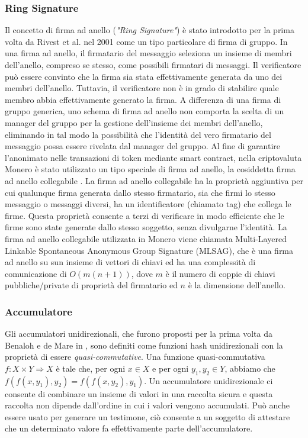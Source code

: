 \subsubsection{Ring Signature}
Il concetto di firma ad anello (\emph{"Ring Signature"}) è stato introdotto per la prima volta da Rivest et al. \cite{c27} nel 2001 come un tipo particolare di firma di gruppo. In una firma ad anello, il firmatario del messaggio seleziona un insieme di membri dell'anello, compreso se stesso, come possibili firmatari di messaggi. Il verificatore può essere convinto che la firma sia stata effettivamente generata da uno dei membri dell'anello.
Tuttavia, il verificatore non è in grado di stabilire quale membro abbia effettivamente generato la firma. A differenza di una firma di gruppo generica, uno schema di firma ad anello non comporta la scelta di un manager del gruppo per la gestione dell'insieme dei membri dell'anello, eliminando in tal modo la possibilità che l'identità del vero firmatario del messaggio possa essere rivelata dal manager del gruppo. Al fine di garantire l'anonimato nelle transazioni di token mediante smart contract, nella criptovaluta Monero è stato utilizzato un tipo speciale di firma ad anello, la cosiddetta firma ad anello collegabile \cite{c20}. La firma ad anello collegabile ha la proprietà aggiuntiva per cui qualunque firma generata dallo stesso firmatario, sia che firmi lo stesso messaggio o messaggi diversi, ha un identificatore (chiamato tag) che collega le firme. Questa proprietà consente a terzi di verificare in modo efficiente che le firme sono state generate dallo stesso soggetto, senza divulgarne l'identità. La firma ad anello collegabile utilizzata in Monero viene chiamata  Multi-Layered Linkable Spontaneous Anonymous Group Signature (MLSAG)\cite{c22}, che è una firma ad anello su sun insieme di vettori di chiavi ed ha una complessità di comunicazione di $O(m(n + 1))$, dove $m$ è il numero di coppie di chiavi pubbliche/private di proprietà del firmatario ed $n$ è la dimensione dell'anello.

\subsubsection{Accumulatore}
Gli accumulatori unidirezionali, che furono proposti per la prima volta da Benaloh e de Mare in \cite{c2}, sono definiti come funzioni hash unidirezionali con la proprietà di essere \emph{quasi-commutative}. Una funzione quasi-commutativa $f: X \times Y \Rightarrow X$ è tale che, per ogni $x \in X$ e per ogni $y_1, y_2 \in Y$, abbiamo che $f(f(x, y_1), y_2) = f(f(x, y_2), y_1)$. Un accumulatore unidirezionale ci consente di combinare un insieme di valori in una raccolta sicura e questa raccolta non dipende dall'ordine in cui i valori vengono accumulati. Può anche essere usato per generare un testimone, ciò consente a un soggetto di attestare che un determinato valore fa effettivamente parte dell'accumulatore.

